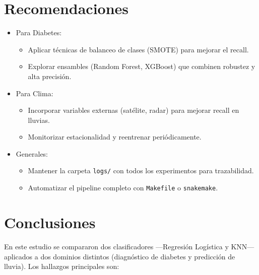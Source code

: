 \documentclass[journal]{IEEEtran}
\begin{document}
\section{Recomendaciones}
\begin{itemize}
  \item Para Diabetes:
    \begin{itemize}
      \item Aplicar técnicas de balanceo de clases (SMOTE) para mejorar el recall.  
      \item Explorar ensambles (Random Forest, XGBoost) que combinen robustez y alta precisión.  
    \end{itemize}
  \item Para Clima:
    \begin{itemize}
      \item Incorporar variables externas (satélite, radar) para mejorar recall en lluvias.  
      \item Monitorizar estacionalidad y reentrenar periódicamente.  
    \end{itemize}
  \item Generales:
    \begin{itemize}
      \item Mantener la carpeta \texttt{logs/} con todos los experimentos para trazabilidad.  
      \item Automatizar el pipeline completo con \texttt{Makefile} o \texttt{snakemake}.  
    \end{itemize}
\end{itemize}

\section{Conclusiones}
En este estudio se compararon dos clasificadores —Regresión Logística y KNN— aplicados a dos dominios distintos (diagnóstico de diabetes y predicción de lluvia). Los hallazgos principales son:
\end{document}
